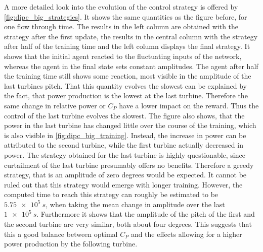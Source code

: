 A more detailed look into the evolution of the control strategy is offered by \autoref{fig:dipc_big_strategies}. It shows the same quantities as the figure before, for one flow through time. The results in the left column are obtained with the strategy after the first update, the results in the central column with the strategy after half of the training time and the left column displays the final strategy. It shows that the initial agent reacted to the fluctuating inputs of the network, whereas the agent in the final state sets constant amplitudes. The agent after half the training time still shows some reaction, most visible in the amplitude of the last turbines pitch. That this quantity evolves the slowest can be explained by the fact, that power production is the lowest at the last turbine. Therefore the same change in relative power or $C_P$ have a lower impact on the reward. Thus the control of the last turbine evolves the slowest. The figure also shows, that the power in the last turbine has changed little over the course of the training, which is also visible in \autoref{fig:dipc_big_training}. Instead, the increase in power can be attributed to the second turbine, while the first turbine actually decreased in power. The strategy obtained for the last turbine is highly questionable, since curtailment of the last turbine presumably offers no benefits. Therefore a greedy strategy, that is an amplitude of zero degrees would be expected. It cannot be ruled out that this strategy would emerge with longer training. However, the computed time to reach this strategy can roughly be estimated to be $\SI{5.75e5}{s}$, when taking the mean change in amplitude over the last $\SI{1e5}{s}$. Furthermore it shows that the amplitude of the pitch of the first and the second turbine are very similar, both about four degrees. This suggests that this a good balance between optimal $C_P$ and the effects allowing for a higher power production by the following turbine.
